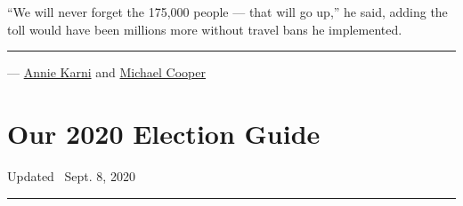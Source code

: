 ``We will never forget the 175,000 people --- that will go up,'' he
said, adding the toll would have been millions more without travel bans
he implemented.

\begin{center}\rule{0.5\linewidth}{\linethickness}\end{center}

--- \href{https://www.nytimes3xbfgragh.onion/by/annie-karni}{Annie
Karni} and
\href{https://www.nytimes3xbfgragh.onion/by/michael-cooper}{Michael
Cooper}

\hypertarget{our-2020-election-guide}{%
\section{Our 2020 Election Guide}\label{our-2020-election-guide}}

Updated ~Sept. 8, 2020

\begin{center}\rule{0.5\linewidth}{\linethickness}\end{center}


